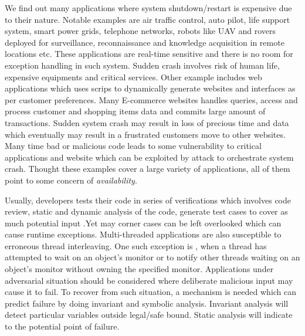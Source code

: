 {We find out many applications where system shutdown/restart is expensive due to
their nature.
Notable examples are air traffic control, auto pilot, life support system, smart
power grids, telephone networks, robots like UAV and rovers deployed for
surveillance, reconnaissance and knowledge acquisition in remote locations etc.
These applications are real-time sensitive and there is no room for exception
handling in such system.
Sudden crash involves risk of human life, expensive equipments and critical
services.
Other example includes web applications which uses scrips to dynamically
generate websites and interfaces as per customer preferences.
Many E-commerce websites handles queries, access and process customer and
shopping items data and commits large amount of transactions.
Sudden system crash may result in loss of precious time and data which
eventually may result in a frustrated customers move to other websites.
Many time bad or malicious code leads to some vulnerability to critical
applications and website which can be exploited by attack to orchestrate system
crash. Thought these examples cover a large variety of applications, all of them
point to some concern of \emph{availability}.

Usually, developers tests their code in series of verifications which involves
code review, static and dynamic analysis of the code, generate test cases to
cover as much potential input .Yet may corner cases can be left overlooked which
can cause runtime exceptions.
Multi-threaded applications are also susceptible to erroneous thread
interleaving. One such exception is
, when a thread has attempted to
wait on an object's monitor or to notify other threads waiting on an object's
monitor without owning the specified monitor. Applications under adversarial
situation should be considered where deliberate malicious input may cause it to
fail. To recover from such situation, a mechanism is needed which can predict
failure by doing invariant and symbolic analysis. Invariant analysis will detect
particular variables outside legal/safe bound. Static analysis will indicate
to the potential point of failure.
}






